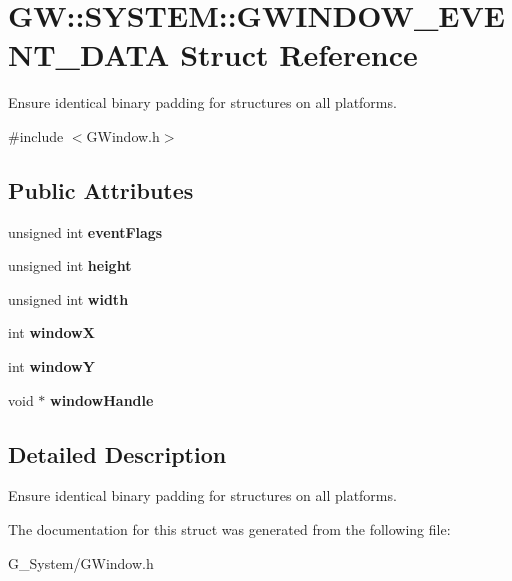 \hypertarget{struct_g_w_1_1_s_y_s_t_e_m_1_1_g_w_i_n_d_o_w___e_v_e_n_t___d_a_t_a}{}\section{GW\+:\+:S\+Y\+S\+T\+EM\+:\+:G\+W\+I\+N\+D\+O\+W\+\_\+\+E\+V\+E\+N\+T\+\_\+\+D\+A\+TA Struct Reference}
\label{struct_g_w_1_1_s_y_s_t_e_m_1_1_g_w_i_n_d_o_w___e_v_e_n_t___d_a_t_a}


Ensure identical binary padding for structures on all platforms.  




{\ttfamily \#include $<$G\+Window.\+h$>$}

\subsection*{Public Attributes}
\begin{DoxyCompactItemize}
\item 
\mbox{\label{struct_g_w_1_1_s_y_s_t_e_m_1_1_g_w_i_n_d_o_w___e_v_e_n_t___d_a_t_a_a9a3463e7fe90f6c9cb4c4f7d68f62ee1}} 
unsigned int {\bfseries event\+Flags}
\item 
\mbox{\label{struct_g_w_1_1_s_y_s_t_e_m_1_1_g_w_i_n_d_o_w___e_v_e_n_t___d_a_t_a_a1bd478c20e20d67fcef4278888f29225}} 
unsigned int {\bfseries height}
\item 
\mbox{\label{struct_g_w_1_1_s_y_s_t_e_m_1_1_g_w_i_n_d_o_w___e_v_e_n_t___d_a_t_a_aedd64cb9564e161fc24a9ea597576dc9}} 
unsigned int {\bfseries width}
\item 
\mbox{\label{struct_g_w_1_1_s_y_s_t_e_m_1_1_g_w_i_n_d_o_w___e_v_e_n_t___d_a_t_a_acb671b49c59e58b84d797e5c3ac6deaf}} 
int {\bfseries windowX}
\item 
\mbox{\label{struct_g_w_1_1_s_y_s_t_e_m_1_1_g_w_i_n_d_o_w___e_v_e_n_t___d_a_t_a_aaf455dc933271e4ba81225b8b0433ebc}} 
int {\bfseries windowY}
\item 
\mbox{\label{struct_g_w_1_1_s_y_s_t_e_m_1_1_g_w_i_n_d_o_w___e_v_e_n_t___d_a_t_a_a08f52d27570c3cad613dd19fe72a88ac}} 
void $\ast$ {\bfseries window\+Handle}
\end{DoxyCompactItemize}


\subsection{Detailed Description}
Ensure identical binary padding for structures on all platforms. 

The documentation for this struct was generated from the following file\+:\begin{DoxyCompactItemize}
\item 
G\+\_\+\+System/G\+Window.\+h\end{DoxyCompactItemize}
